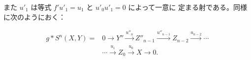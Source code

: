 \begin{center}
\end{center}
また $u'_1$ は等式 $f'u'_1=u_1$ と $u'_0u'_1=0$ によって一意に
定まる射である。同様に次のようにおく：

\begin{equation}
\begin{aligned}
g*S^n(X,Y)={}&0\longrightarrow Y''\xrightarrow{u''_n}Z''_{n-1}
\xrightarrow{u''_{n-1}}Z_{n-2}\xrightarrow{u_{n-2}}\cdots\\
&\cdots\xrightarrow{u_1}Z_0\xrightarrow{u_0}X\longrightarrow0.
\end{aligned}
\tag{3.2.8.2}
\end{equation}
\endgroup
